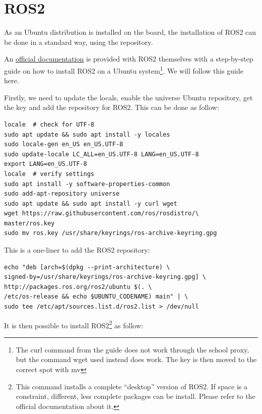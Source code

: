 \documentclass[10pt]{article}
\begin{document}
\pagebreak
\section{ROS2}
\label{sec:ros2}
As an Ubuntu distribution is installed on the board, the installation of ROS2 can be done
in a standard way, using the repository.

An \href{https://docs.ros.org/en/humble/Installation/Ubuntu-Install-Debians.html}{official documentation}
is provided with ROS2 themselves with a step-by-step guide on how to install
ROS2 on a Ubuntu system\footnote{The curl command from the guide does not work through the school proxy,
  but the command wget used instead does work. The key is then moved to the correct spot with mv}.
We will follow this guide here.

Firstly, we need to update the locals,  enable the universe Ubuntu repository, get the key and add the repository for ROS2. This can be done as follow:

\begin{tcolorbox}
\begin{verbatim}
locale  # check for UTF-8
sudo apt update && sudo apt install -y locales
sudo locale-gen en_US en_US.UTF-8
sudo update-locale LC_ALL=en_US.UTF-8 LANG=en_US.UTF-8
export LANG=en_US.UTF-8
locale  # verify settings
sudo apt install -y software-properties-common
sudo add-apt-repository universe
sudo apt update && sudo apt install -y curl wget
wget https://raw.githubusercontent.com/ros/rosdistro/\
master/ros.key
sudo mv ros.key /usr/share/keyrings/ros-archive-keyring.gpg
\end{verbatim}
\end{tcolorbox}


This is a one-liner to add the ROS2 repository:

\begin{tcolorbox}
\begin{verbatim}
echo "deb [arch=$(dpkg --print-architecture) \
signed-by=/usr/share/keyrings/ros-archive-keyring.gpg] \
http://packages.ros.org/ros2/ubuntu $(. \
/etc/os-release && echo $UBUNTU_CODENAME) main" | \
sudo tee /etc/apt/sources.list.d/ros2.list > /dev/null
\end{verbatim}
\end{tcolorbox}

It is then possible to install ROS2\footnote{This command installs a complete ``desktop'' version of ROS2. If space is a constraint, different, less complete packages can be install. Please refer to the official documentation about it.} as follow:
\end{document}
